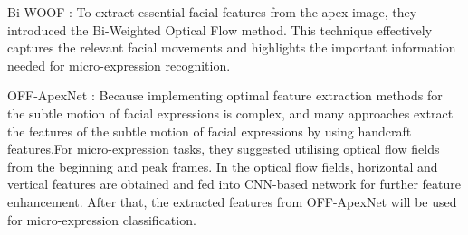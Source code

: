 \documentclass[review,12pt, 3p]{elsarticle}
\begin{document}
Bi-WOOF \cite{ref-24}: To extract essential facial features from the apex image, they introduced the Bi-Weighted Optical Flow method. This technique effectively captures the relevant facial movements and highlights the important information needed for micro-expression recognition.

OFF-ApexNet \cite{ref-9}: Because implementing optimal feature extraction methods for the subtle motion of facial expressions is complex, and many approaches extract the features of the subtle motion of facial expressions by using handcraft features.For micro-expression tasks, they suggested utilising optical flow fields from the beginning and peak frames. In the optical flow fields, horizontal and vertical features are obtained and fed into CNN-based network for further feature enhancement. After that, the extracted features from OFF-ApexNet will be used for micro-expression classification. 
\end{document}
